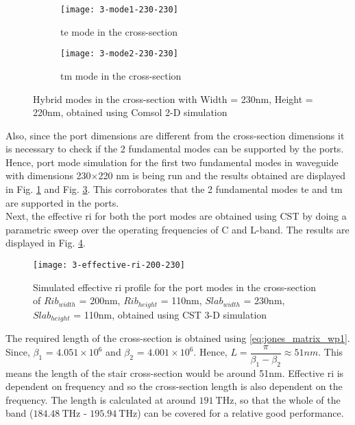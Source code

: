 \documentclass[../report.tex]{subfiles}
\begin{document}
\begin{figure}[H] %
	\begin{subfigure}[t]{0.45\textwidth}
		\texttt{[image: 3-mode1-230-230]}
		\caption{\gls{te} mode in the cross-section}
		\label{fig:3_mode1_230_230}
	\end{subfigure}
	\hfill
	\begin{subfigure}[t]{0.45\textwidth}
		\texttt{[image: 3-mode2-230-230]}
		\caption{\gls{tm} mode in the cross-section}
		\label{fig:3_mode2_230_230}
	\end{subfigure}
	\caption{Hybrid modes in the cross-section with Width = 230nm, Height = 220nm, obtained using Comsol 2-D simulation}
\end{figure}

\noindent Also, since the port dimensions are different from the cross-section dimensions it is necessary to check if the 2 fundamental modes can be supported by the ports. Hence, port mode simulation for the first two fundamental modes in waveguide with dimensions 230$\times$220 nm is being run and the results obtained are displayed in Fig. \ref{fig:3_mode1_230_230} and Fig. \ref{fig:3_mode2_230_230}. This corroborates that the 2 fundamental modes \gls{te} and \gls{tm} are supported in the ports.\\

\noindent Next, the effective \gls{ri} for both the port modes are obtained using CST by doing a parametric sweep over the operating frequencies of C and L-band. The results are displayed in Fig. \ref{fig:3_effective_ri_200_230}. 

\begin{figure}[H] %
	\centering
	\texttt{[image: 3-effective-ri-200-230]}
	\caption{Simulated effective \gls{ri} profile for the port modes in the cross-section of $Rib_{width}$ = 200nm, $Rib_{height}$ = 110nm, $Slab_{width}$ = 230nm, $Slab_{height}$ = 110nm, obtained using CST 3-D simulation}
	\label{fig:3_effective_ri_200_230}
\end{figure}

\noindent The required length of the cross-section is obtained using \ref{eq:jones_matrix_wp1}. Since, $\beta_1$ = $4.051 \times 10^6$  and $\beta_2$ = $4.001 \times 10^6$. Hence, $L = \dfrac{\pi}{\beta_1 - \beta_2} \approx 51nm$. This means the length of the stair cross-section would be around 51nm. Effective \gls{ri} is dependent on frequency and so the cross-section length is also dependent on the frequency. The length is calculated at around $\SI{191}{\THz}$, so that the whole of the band ($\SI{184.48}{\THz}$ - $\SI{195.94}{\THz}$) can be covered for a relative good performance. 
\end{document}
